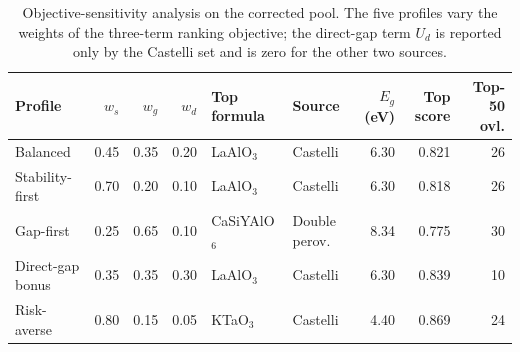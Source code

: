\begin{table}[htbp]
\centering
\footnotesize
\setlength{\tabcolsep}{3pt}
\caption{Objective-sensitivity analysis on the corrected pool. The five profiles vary the weights of the three-term ranking objective; the direct-gap term $U_d$ is reported only by the Castelli set and is zero for the other two sources.}
\label{tab:a1_corrected_sens}
\begin{tabular}{lrrrllrrr}
\toprule
Profile & $w_s$ & $w_g$ & $w_d$ & Top formula & Source & $E_g$ (eV) & Top score & Top-50 ovl. \\
\midrule
Balanced & 0.45 & 0.35 & 0.20 & LaAlO$_{3}$ & Castelli & 6.30 & 0.821 & 26 \\
Stability-first & 0.70 & 0.20 & 0.10 & LaAlO$_{3}$ & Castelli & 6.30 & 0.818 & 26 \\
Gap-first & 0.25 & 0.65 & 0.10 & CaSiYAlO$_{6}$ & Double perov. & 8.34 & 0.775 & 30 \\
Direct-gap bonus & 0.35 & 0.35 & 0.30 & LaAlO$_{3}$ & Castelli & 6.30 & 0.839 & 10 \\
Risk-averse & 0.80 & 0.15 & 0.05 & KTaO$_{3}$ & Castelli & 4.40 & 0.869 & 24 \\
\bottomrule
\end{tabular}
\end{table}

